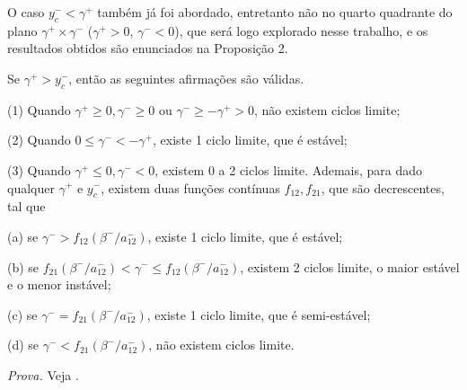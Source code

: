 O caso $y_c^-<\gamma^+$ também já foi abordado, entretanto não no quarto quadrante do plano $\gamma^+\times \gamma^-$ ($\gamma^+>0$, $\gamma^-<0$), que será logo explorado nesse trabalho, e os resultados obtidos são enunciados na Proposição 2.
\begin{proposition}
Se $\gamma^{+}>y_{c}^{-}$, então as seguintes afirmações são válidas.

(1) Quando $\gamma^{+} \geq 0, \gamma^{-} \geq 0$ ou $\gamma^{-} \geq-\gamma^{+}>0$, não existem ciclos limite;

(2) Quando $0 \leq \gamma^{-}<-\gamma^{+}$, existe 1 ciclo limite, que é estável;

(3) Quando $\gamma^{+} \leq 0, \gamma^{-}<0$, existem 0 a 2 ciclos limite. Ademais, para dado qualquer $\gamma^{+}$ e $y_{c}^{-}$, existem duas funções contínuas $f_{12}, f_{21}$, que são decrescentes, tal que

\qquad(a) se $\gamma^{-}>f_{12}\left(\beta^{-} / a_{12}^{-}\right)$, existe 1 ciclo limite, que é estável;

\qquad(b) se $f_{21}\left(\beta^{-} / a_{12}^{-}\right)<\gamma^{-} \leq f_{12}\left(\beta^{-} / a_{12}^{-}\right)$, existem 2 ciclos limite, o maior estável e o menor instável;

\qquad(c) se $\gamma^{-}=f_{21}\left(\beta^{-} / a_{12}^{-}\right)$, existe 1 ciclo limite, que é semi-estável;

\qquad(d) se $\gamma^{-}<f_{21}\left(\beta^{-} / a_{12}^{-}\right)$, não existem ciclos limite.
\end{proposition}
\textit{Prova.} Veja \cite{Huan:etal:2012}.

